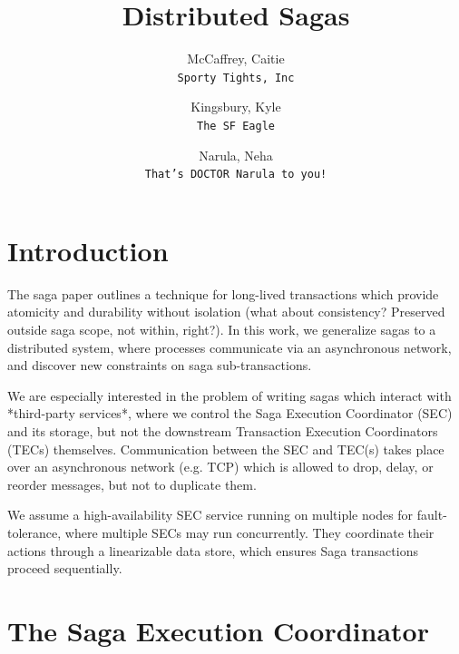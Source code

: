 \documentclass{article}
\author{
  McCaffrey, Caitie\\
  \texttt{Sporty Tights, Inc}
  \and
  Kingsbury, Kyle\\
  \texttt{The SF Eagle}
  \and
  Narula, Neha\\
  \texttt{That's DOCTOR Narula to you!}
}
\title{Distributed Sagas}
\begin{document}
\maketitle

\section{Introduction}

The saga paper outlines a technique for long-lived transactions which provide
atomicity and durability without isolation (what about consistency? Preserved
outside saga scope, not within, right?). In this work, we generalize sagas to
a distributed system, where processes communicate via an asynchronous network,
and discover new constraints on saga sub-transactions.

We are especially interested in the problem of writing sagas which interact with
*third-party services*, where we control the Saga Execution Coordinator (SEC)
and its storage, but not the downstream Transaction Execution Coordinators
(TECs) themselves. Communication between the SEC and TEC(s) takes place over an
asynchronous network (e.g. TCP) which is allowed to drop, delay, or reorder
messages, but not to duplicate them.

We assume a high-availability SEC service running on multiple nodes for
fault-tolerance, where multiple SECs may run concurrently. They coordinate
their actions through a linearizable data store, which ensures Saga
transactions proceed sequentially.

\section{The Saga Execution Coordinator}
\end{document}
